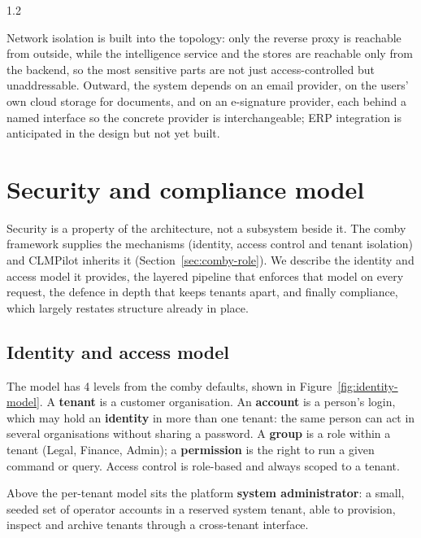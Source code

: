 \begin{spacing}{1.2}

Network isolation is built into the topology: only the reverse proxy is reachable
from outside, while the intelligence service and the stores are reachable only from
the backend, so the most sensitive parts are not just access-controlled but
unaddressable. Outward, the system depends on an email provider, on the
users' own cloud storage for documents, and on an e-signature provider,
each behind a named interface so the concrete provider is interchangeable;
ERP integration is anticipated in the design but not yet built.

\section{Security and compliance model}
\label{sec:security}

Security is a property of the architecture, not a subsystem beside it. The
comby framework supplies the mechanisms (identity, access control and tenant
isolation) and CLMPilot inherits it (Section~\ref{sec:comby-role}). We
describe the identity and access model it provides, the layered pipeline that
enforces that model on every request, the defence in depth that keeps tenants
apart, and finally compliance, which largely restates
structure already in place.

\subsection{Identity and access model}
\label{sec:identity-model}

The model has 4 levels from the comby defaults, shown in
Figure~\ref{fig:identity-model}. A \textbf{tenant} is a customer
organisation. An \textbf{account} is a person's login, which may hold an
\textbf{identity} in more than one tenant: the same person can act in
several organisations without sharing a password. A \textbf{group} is a role
within a tenant (Legal, Finance, Admin); a \textbf{permission} is the right
to run a given command or query. Access control is role-based and always
scoped to a tenant.


Above the per-tenant model sits the platform \textbf{system administrator}:
a small, seeded set of operator accounts in a reserved system tenant, able
to provision, inspect and archive tenants through a cross-tenant interface.


\end{spacing}
